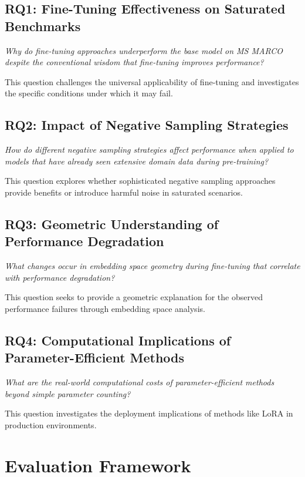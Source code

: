 \subsection{RQ1: Fine-Tuning Effectiveness on Saturated Benchmarks}

\textit{Why do fine-tuning approaches underperform the base model on MS MARCO despite the conventional wisdom that fine-tuning improves performance?}

This question challenges the universal applicability of fine-tuning and investigates the specific conditions under which it may fail.

\subsection{RQ2: Impact of Negative Sampling Strategies}

\textit{How do different negative sampling strategies affect performance when applied to models that have already seen extensive domain data during pre-training?}

This question explores whether sophisticated negative sampling approaches provide benefits or introduce harmful noise in saturated scenarios.

\subsection{RQ3: Geometric Understanding of Performance Degradation}

\textit{What changes occur in embedding space geometry during fine-tuning that correlate with performance degradation?}

This question seeks to provide a geometric explanation for the observed performance failures through embedding space analysis.

\subsection{RQ4: Computational Implications of Parameter-Efficient Methods}

\textit{What are the real-world computational costs of parameter-efficient methods beyond simple parameter counting?}

This question investigates the deployment implications of methods like LoRA in production environments.

\section{Evaluation Framework}

